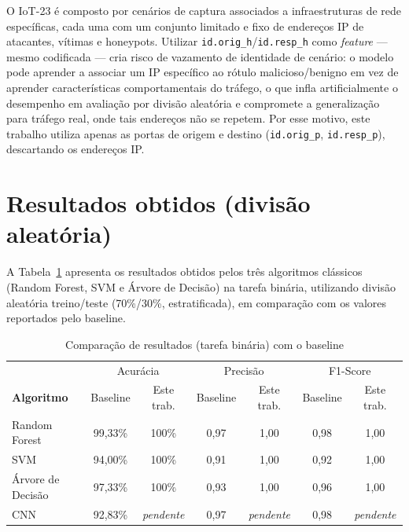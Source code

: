 O IoT-23 é composto por cenários de captura associados a infraestruturas de rede específicas, cada uma com um conjunto limitado e fixo de endereços IP de atacantes, vítimas e honeypots. Utilizar \texttt{id.orig\_h}/\texttt{id.resp\_h} como \textit{feature} — mesmo codificada — cria risco de vazamento de identidade de cenário: o modelo pode aprender a associar um IP específico ao rótulo malicioso/benigno em vez de aprender características comportamentais do tráfego, o que infla artificialmente o desempenho em avaliação por divisão aleatória e compromete a generalização para tráfego real, onde tais endereços não se repetem. Por esse motivo, este trabalho utiliza apenas as portas de origem e destino (\texttt{id.orig\_p}, \texttt{id.resp\_p}), descartando os endereços IP.

\section{Resultados obtidos (divisão aleatória)}
\label{sec:resultados-split-aleatorio}

A Tabela~\ref{tab:resultados-split-aleatorio} apresenta os resultados obtidos pelos três algoritmos clássicos (Random Forest, SVM e Árvore de Decisão) na tarefa binária, utilizando divisão aleatória treino/teste (70\%/30\%, estratificada), em comparação com os valores reportados pelo baseline.

\begin{table}[htbp]
\centering
\caption{Comparação de resultados (tarefa binária) com o baseline}
\label{tab:resultados-split-aleatorio}
\begin{tabular}{@{}lcccccc@{}}
\toprule
& \multicolumn{2}{c}{Acurácia} & \multicolumn{2}{c}{Precisão} & \multicolumn{2}{c}{F1-Score} \\
\textbf{Algoritmo} & Baseline & Este trab. & Baseline & Este trab. & Baseline & Este trab. \\
\midrule
Random Forest & 99{,}33\% & 100\% & 0{,}97 & 1{,}00 & 0{,}98 & 1{,}00 \\
SVM & 94{,}00\% & 100\% & 0{,}91 & 1{,}00 & 0{,}92 & 1{,}00 \\
Árvore de Decisão & 97{,}33\% & 100\% & 0{,}93 & 1{,}00 & 0{,}96 & 1{,}00 \\
CNN & 92{,}83\% & \textit{pendente} & 0{,}97 & \textit{pendente} & 0{,}98 & \textit{pendente} \\
\bottomrule
\end{tabular}
\end{table}

